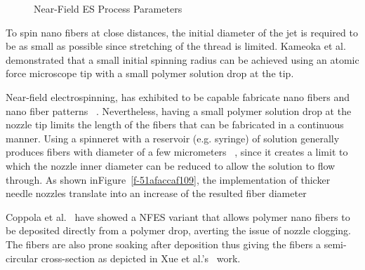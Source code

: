 \bgroup
\begin{figure}[!htbp]
\centering \makeatletter{}
\makeatother 
\caption{{Near-Field ES Process Parameters}}
\label{f-3629d3a3f9cf}
\end{figure}
\egroup
To spin nano fibers at close distances, the initial diameter of the jet is required to be as small as possible since stretching of the thread is limited. Kameoka et al.\unskip~\cite{527120:12321556} demonstrated that a small initial spinning radius can be achieved using an atomic force microscope tip with a small polymer solution drop at the tip.

Near-field electrospinning, has exhibited to be capable fabricate nano fibers and nano fiber patterns \unskip~\cite{527120:11974321}. Nevertheless, having a small polymer solution drop at the nozzle tip limits the length of the fibers that can be fabricated in a continuous manner. Using a spinneret with a reservoir (e.g. syringe) of solution generally produces fibers with diameter of a few micrometers \unskip~\cite{527120:11974310,527120:11974326}, since it creates a limit to which the nozzle inner diameter can be reduced to allow the solution to flow through. As shown inFigure~\ref{f-51afaccaf109}, the implementation of thicker needle nozzles translate into an increase of the resulted fiber diameter

Coppola et al.\unskip~\cite{527120:11974307} have showed a NFES variant that allows polymer nano fibers to be deposited directly from a polymer drop, averting the issue of nozzle clogging. The fibers are also prone soaking after deposition thus giving the fibers a semi-circular cross-section as depicted in Xue et al.'s\unskip~\cite{527120:11974326} work.



